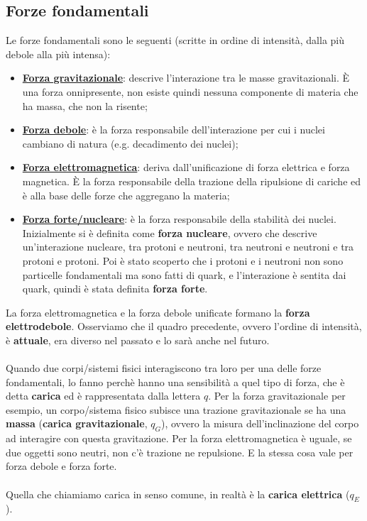     \subsection{Forze fondamentali}
        Le forze fondamentali sono le seguenti (scritte in ordine di intensità, dalla più debole alla più intensa):
        \begin{itemize}
            \item \underline{\textbf{Forza gravitazionale}}: descrive l'interazione tra le masse gravitazionali. È una forza onnipresente, non esiste quindi nessuna componente di materia che ha massa, che non la risente;
            \item \underline{\textbf{Forza debole}}: è la forza responsabile dell'interazione per cui i nuclei cambiano di natura (e.g. decadimento dei nuclei);
            \item \underline{\textbf{Forza elettromagnetica}}: deriva dall'unificazione di forza elettrica e forza magnetica. È la forza responsabile della trazione della ripulsione di cariche ed è alla base delle forze che aggregano la materia;
            \item \underline{\textbf{Forza forte/nucleare}}: è la forza responsabile della stabilità dei nuclei. Inizialmente si è definita come \textbf{forza nucleare}, ovvero che descrive un'interazione nucleare, tra protoni e neutroni, tra neutroni e neutroni e tra protoni e protoni. Poi è stato scoperto che i protoni e i neutroni non sono particelle fondamentali ma sono fatti di quark, e l'interazione è sentita dai quark, quindi è stata definita \textbf{forza forte}.
            \\
        \end{itemize}

        La forza elettromagnetica e la forza debole unificate formano la \textbf{forza elettrodebole}.
        Osserviamo che il quadro precedente, ovvero l'ordine di intensità, è \textbf{attuale}, era diverso nel passato e lo sarà anche nel futuro.\\\\
        Quando due corpi/sistemi fisici interagiscono tra loro per una delle forze fondamentali, lo fanno perchè hanno una sensibilità a quel tipo di forza, che è detta \textbf{carica} ed è rappresentata dalla lettera $q$. Per la forza gravitazionale per esempio, un corpo/sistema fisico subisce una trazione gravitazionale se ha una \textbf{massa} (\textbf{carica gravitazionale}, $q_G$), ovvero la misura dell'inclinazione del corpo ad interagire con questa gravitazione. Per la forza elettromagnetica è uguale, se due oggetti sono neutri, non c'è trazione ne repulsione. E la stessa cosa vale per forza debole e forza forte.\\\\
        Quella che chiamiamo carica in senso comune, in realtà è la \textbf{carica elettrica} ($q_E$).


